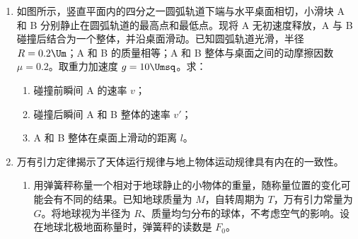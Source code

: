 \documentclass[\gkver]{gaokaozhenti}
\begin{document}
\begin{enumerate}
{（3）$U-I$ 图线见答案图。

（4）根据 $U-I$ 图像，电源的电动势等于纵轴的截距，内阻为斜率的绝对值。

（5）电源输出功率 $P=UI=U\left(\frac{E-U}{r}\right)=-\frac{1}{r}U^{2}+\frac{E}{r}U$，$P-U$ 图像为开口向下的二次函数，应选（C）。
}

\item
如图所示，竖直平面内的四分之一圆弧轨道下端与水平桌面相切，小滑块 A 和 B 分别静止在圆弧轨道的最高点和最低点。现将 A 无初速度释放，A 与 B 碰撞后结合为一个整体，并沿桌面滑动。已知圆弧轨道光滑，半径 $R=0.2\Um$；A 和 B 的质量相等；A 和 B 整体与桌面之间的动摩擦因数 $\mu=0.2$。取重力加速度 $g=10\Umsq$。求：
\begin{enumerate}
	\item
	碰撞前瞬间 A 的速率 $v$；
	\item
	碰撞后瞬间 A 和 B 整体的速率 $v'$；
	\item
	A 和 B 整体在桌面上滑动的距离 $l$。
\end{enumerate}
\jdanswer{
\begin{enumerate}
	\item
	$2\Ums$
	\item
	$1\Ums$
	\item
	$0.25\Um$
\end{enumerate}
}

\item
万有引力定律揭示了天体运行规律与地上物体运动规律具有内在的一致性。
\begin{enumerate}
	\item
	用弹簧秤称量一个相对于地球静止的小物体的重量，随称量位置的变化可能会有不同的结果。已知地球质量为 $M$，自转周期为 $T$，万有引力常量为 $G$。将地球视为半径为 $R$、质量均匀分布的球体，不考虑空气的影响。设在地球北极地面称量时，弹簧秤的读数是 $F_{0}$。


\end{enumerate}
\end{enumerate}
\end{document}
